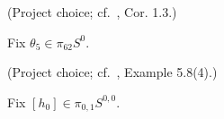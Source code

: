 \begin{definition}
\label{frontier:Literature:7bbc7d9fc81d}
(Project choice; cf.\ \cite{Xu}, Cor. 1.3.)\par{}

Fix $\theta_5\in\pi_{62}S^0$.
\end{definition}

\begin{definition}
\label{frontier:Literature:85883e4bcc3f}
(Project choice; cf.\ \cite{LWX126}, Example 5.8(4).)\par{}

Fix $[h_0]\in\pi_{0,1}S^{0,0}$.
\end{definition}

